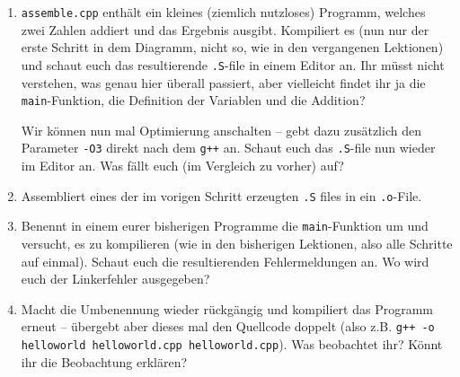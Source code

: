\begin{praxis}
    \begin{enumerate}
        \item \texttt{assemble.cpp} enthält ein kleines (ziemlich nutzloses)
              Programm, welches zwei Zahlen addiert und das Ergebnis ausgibt.
              Kompiliert es (nun nur der erste Schritt in dem Diagramm, nicht so, wie
              in den vergangenen Lektionen) und schaut euch das resultierende
              \texttt{.S}-file in einem Editor an. Ihr müsst nicht verstehen,
              was genau hier überall passiert, aber vielleicht findet ihr ja die
              \texttt{main}-Funktion, die Definition der Variablen und die Addition?

              Wir können nun mal Optimierung anschalten -- gebt dazu zusätzlich den
              Parameter \texttt{-O3} direkt nach dem \texttt{g++} an. Schaut euch das
              \texttt{.S}-file nun wieder im Editor an. Was fällt euch
              (im Vergleich zu vorher) auf?
        \item Assembliert eines der im vorigen Schritt erzeugten \texttt{.S} files
              in ein \texttt{.o}-File.
        \item Benennt in einem eurer bisherigen Programme die
              \texttt{main}-Funktion um und versucht, es zu kompilieren (wie in den
              bisherigen Lektionen, also alle Schritte auf einmal). Schaut euch die
              resultierenden Fehlermeldungen an. Wo wird euch der Linkerfehler
              ausgegeben?
        \item Macht die Umbenennung wieder rückgängig und kompiliert das Programm
              erneut -- übergebt aber dieses mal den Quellcode doppelt (also z.B.
              \texttt{g++ -o helloworld helloworld.cpp helloworld.cpp}). Was
              beobachtet ihr? Könnt ihr die Beobachtung erklären?
    \end{enumerate}

\end{praxis}
